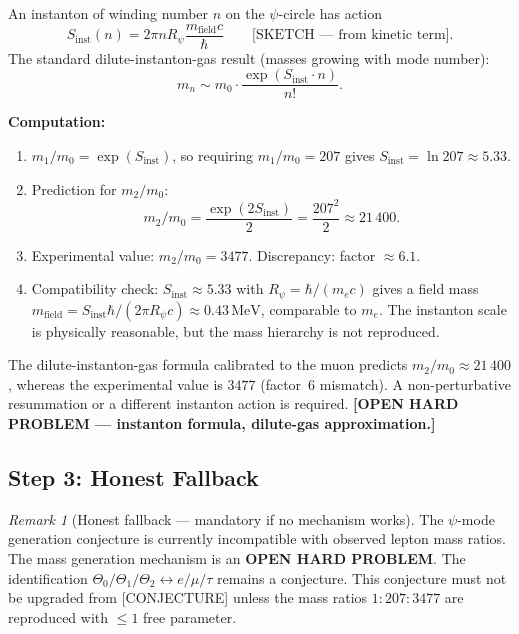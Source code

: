 \documentclass[12pt,a4paper]{article}
\theoremstyle{remark}
\newtheorem{remark}[theorem]{Remark}
\begin{document}
An instanton of winding number $n$ on the $\psi$-circle has action
\[
  S_\mathrm{inst}(n) = 2\pi n R_\psi \frac{m_\mathrm{field} c}{\hbar}
  \qquad \text{[SKETCH --- from kinetic term]}.
\]
The standard dilute-instanton-gas result (masses growing with mode number):
\[
  m_n \sim m_0 \cdot \frac{\exp(S_\mathrm{inst} \cdot n)}{n!}.
\]

\noindent\textbf{Computation:}
\begin{enumerate}
  \item[(a)] $m_1/m_0 = \exp(S_\mathrm{inst})$, so requiring $m_1/m_0 = 207$
    gives $S_\mathrm{inst} = \ln 207 \approx 5.33$.
  \item[(b)] Prediction for $m_2/m_0$:
    \[
      m_2/m_0 = \frac{\exp(2 S_\mathrm{inst})}{2} = \frac{207^2}{2} \approx 21\,400.
    \]
  \item[(c)] Experimental value: $m_2/m_0 = 3477$.
    Discrepancy: factor $\approx 6.1$.
  \item[(d)] Compatibility check: $S_\mathrm{inst} \approx 5.33$ with
    $R_\psi = \hbar/(m_e c)$ gives a field mass
    $m_\mathrm{field} = S_\mathrm{inst} \hbar/(2\pi R_\psi c) \approx 0.43\,\text{MeV}$,
    comparable to $m_e$.  The instanton scale is physically reasonable,
    but the mass hierarchy is not reproduced.
\end{enumerate}

The dilute-instanton-gas formula calibrated to the muon predicts $m_2/m_0
\approx 21\,400$, whereas the experimental value is $3477$ (factor~$6$
mismatch).  A non-perturbative resummation or a different instanton action
is required.
\textbf{[OPEN HARD PROBLEM --- instanton formula, dilute-gas approximation.]}

\subsection{Step 3: Honest Fallback}
\label{subsec:honest_fallback}

\begin{remark}[Honest fallback --- mandatory if no mechanism works]
  The $\psi$-mode generation conjecture is currently incompatible with
  observed lepton mass ratios.  The mass generation mechanism is an
  \textbf{OPEN HARD PROBLEM}.  The identification $\Theta_0/\Theta_1/\Theta_2
  \leftrightarrow e/\mu/\tau$ remains a conjecture.
  This conjecture must not be upgraded from [CONJECTURE] unless the mass
  ratios $1 : 207 : 3477$ are reproduced with $\leq 1$ free parameter.
\end{remark}
\end{document}
